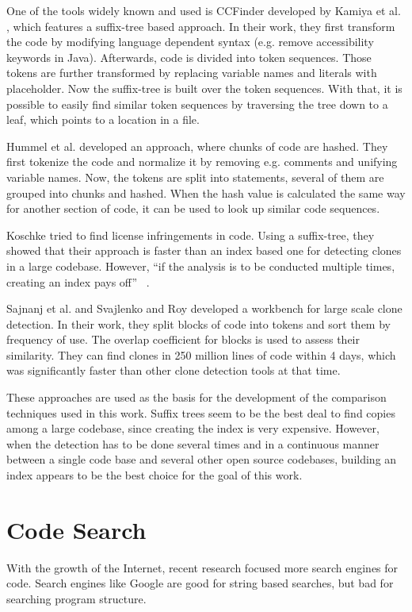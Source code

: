 One of the tools widely known and used is CCFinder developed by Kamiya et al. \cite{kamiya2002ccfinder}, which features a suffix-tree based approach.
In their work, they first transform the code by modifying language dependent syntax (e.g. remove accessibility keywords in Java).
Afterwards, code is divided into token sequences.
Those tokens are further transformed by replacing variable names and literals with placeholder.
Now the suffix-tree is built over the token sequences. 
With that, it is possible to easily find similar token sequences by traversing the tree down to a leaf, which points to a location in a file.

Hummel et al. \cite{hummel2010index} developed an approach, where chunks of code are hashed.
They first tokenize the code and normalize it by removing e.g. comments and unifying variable names.
Now, the tokens are split into statements, several of them are grouped into chunks and hashed.
When the hash value is calculated the same way for another section of code, it can be used to look up similar code sequences.

Koschke \cite{koschke2014large,koschke2012large} tried to find license infringements in code.
Using a suffix-tree, they showed that their approach is faster than an index based one for detecting clones in a large codebase.
However, ``if the analysis is to be conducted multiple times, creating an index pays off'' \ \cite{koschke2014large}.

Sajnanj et al. \cite{sajnani2016sourcerercc} and Svajlenko and Roy \cite{svajlenko2017fast} developed a workbench for large scale clone detection.
In their work, they split blocks of code into tokens and sort them by frequency of use.
The overlap coefficient for blocks is used to assess their similarity.
They can find clones in 250 million lines of code within 4 days, which was significantly faster than other clone detection tools at that time.

These approaches are used as the basis for the development of the comparison techniques used in this work.
Suffix trees seem to be the best deal to find copies among a large codebase, since creating the index is very expensive.
However, when the detection has to be done several times and in a continuous manner between a single code base and several other open source codebases, building an index appears to be the best choice for the goal of this work.

\section{Code Search}\label{section:related_work/code_search}
With the growth of the Internet, recent research focused more search engines for code.
Search engines like Google are good for string based searches, but bad for searching program structure.

